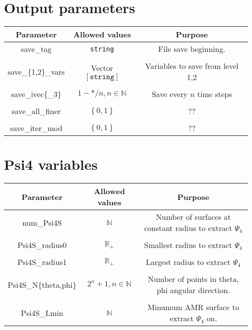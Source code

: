 \documentclass{article}
\begin{document}
\section*{Output parameters}
\begin{table}[h]
   \centering 
   \begin{tabular}{ccc}
      Parameter  & Allowed values & Purpose \\
      \midrule\midrule
      save\_tag 
      &
      \texttt{string}
      &
      File save beginning.
      \\ \\
      save\_\{1,2\}\_vars &
      Vector $\left[\mathtt{string}\right]$
      &
      Variables to save from level 1,2
      \\ \\
      save\_ivec\{\_3\} 
      &
      $1-*/n,n\in\mathbb{N}$
      &
      Save every $n$ time steps
      \\ \\
      save\_all\_finer 
      &
      $\left\{0,1\right\}$
      &
      ??
      \\ \\
      save\_iter\_mod 
      &
      $\left\{0,1\right\}$
      &
      ??
   \end{tabular}
\end{table}

\newpage
\section*{Psi4 variables}
\begin{table}[h]
   \centering 
   \begin{tabular}{ccc}
      Parameter  & Allowed values & Purpose \\
      \midrule\midrule
      num\_Psi4S 
      &
      $\mathbb{N}$
      &
      Number of surfaces at constant radius to extract $\Psi_4$
      \\ \\
      Psi4S\_radius0 
      &
      $\mathbb{R}_+$
      &
      Smallest radius to extract $\Psi_4$
      \\ \\
      Psi4S\_radius1 
      &
      $\mathbb{R}_+$
      &
      Largest radius to extract $\Psi_4$
      \\ \\
      Psi4S\_N\{theta,phi\}
      &
      $2^n+1,n\in\mathbb{N}$
      &
      Number of points in theta, phi angular direction. 
      \\ \\
      Psi4S\_Lmin 
      &
      $\mathbb{N}$
      &
      Minumum AMR surface to extract $\Psi_4$ on.
   \end{tabular}
\end{table}
\end{document}
